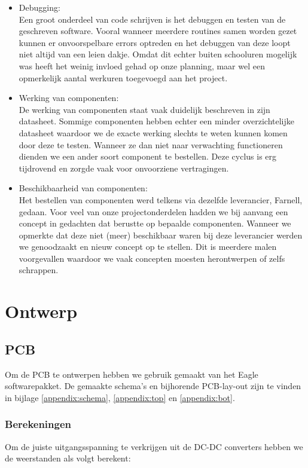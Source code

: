 \documentclass[a4paper,dutch]{article}
\begin{document}
\begin{itemize}
\item	Debugging:\\
Een groot onderdeel van code schrijven is het debuggen en testen van de geschreven software. Vooral wanneer meerdere routines samen worden gezet kunnen er onvoorspelbare errors optreden en het debuggen van deze loopt niet altijd van een leien dakje. Omdat dit echter buiten schooluren mogelijk was heeft het weinig invloed gehad op onze planning, maar wel een opmerkelijk aantal werkuren toegevoegd aan het project.

\item	Werking van componenten:\\
De werking van componenten staat vaak duidelijk beschreven in zijn datasheet. Sommige componenten hebben echter een minder overzichtelijke datasheet waardoor we de exacte werking slechts te weten kunnen komen door deze te testen. Wanneer ze dan niet naar verwachting functioneren dienden we een ander soort component te bestellen. Deze cyclus is erg tijdrovend en zorgde vaak voor onvoorziene vertragingen.

\item	Beschikbaarheid van componenten:\\
Het bestellen van componenten werd telkens via dezelfde leverancier, Farnell, gedaan.
Voor veel van onze projectonderdelen hadden we bij aanvang een concept in gedachten dat berustte op bepaalde componenten. Wanneer we opmerkte dat deze niet (meer) beschikbaar waren bij deze leverancier werden we genoodzaakt en nieuw concept op te stellen. Dit is meerdere malen voorgevallen waardoor we vaak concepten moesten herontwerpen of zelfs schrappen.

\end{itemize}



\section{Ontwerp}
\subsection{PCB}
Om de PCB te ontwerpen hebben we gebruik gemaakt van het Eagle softwarepakket. De gemaakte schema's en bijhorende PCB-lay-out zijn te vinden in  bijlage \ref{appendix:schema}, \ref{appendix:top} en \ref{appendix:bot}. 

\subsubsection{Berekeningen}
Om de juiste uitgangsspanning te verkrijgen uit de DC-DC converters hebben we de weerstanden als volgt berekent:
\end{document}
